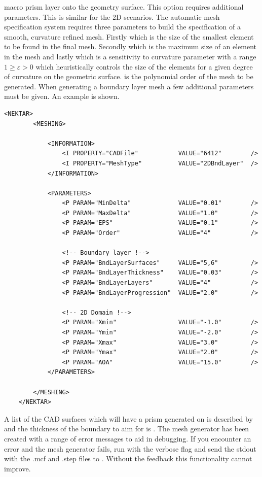 macro prism layer onto the geometry surface. This option requires additional
parameters. This is similar for the 2D scenarios. The automatic mesh
specification system requires three parameters to build the specification of a
smooth, curvature refined mesh. Firstly  which is the size of
the smallest element to be found in the final mesh. Secondly 
which is the maximum size of an element in the mesh and lastly  which
is a sensitivity to curvature parameter with a range $1 \geq \varepsilon > 0$
which heuristically controls the size of the elements for a given degree of
curvature on the geometric surface.  is the polynomial order of the
mesh to be generated.
%
When generating a boundary layer mesh a few additional parameters must be given.
An example is shown.
\begin{lstlisting}[style=XmlStyle]
    <NEKTAR>
        <MESHING>

            <INFORMATION>
                <I PROPERTY="CADFile"           VALUE="6412"        />
                <I PROPERTY="MeshType"          VALUE="2DBndLayer"  />
            </INFORMATION>

            <PARAMETERS>
                <P PARAM="MinDelta"             VALUE="0.01"        />
                <P PARAM="MaxDelta"             VALUE="1.0"         />
                <P PARAM="EPS"                  VALUE="0.1"         />
                <P PARAM="Order"                VALUE="4"           />

                <!-- Boundary layer !-->
                <P PARAM="BndLayerSurfaces"     VALUE="5,6"         />
                <P PARAM="BndLayerThickness"    VALUE="0.03"        />
                <P PARAM="BndLayerLayers"       VALUE="4"           />
                <P PARAM="BndLayerProgression"  VALUE="2.0"         />

                <!-- 2D Domain !-->
                <P PARAM="Xmin"                 VALUE="-1.0"        />
                <P PARAM="Ymin"                 VALUE="-2.0"        />
                <P PARAM="Xmax"                 VALUE="3.0"         />
                <P PARAM="Ymax"                 VALUE="2.0"         />
                <P PARAM="AOA"                  VALUE="15.0"        />
            </PARAMETERS>

        </MESHING>
    </NEKTAR>
\end{lstlisting}
A list of the CAD surfaces which will have a prism generated on is described by
 and the thickness of the boundary to aim for is .
%
The mesh generator has been created with a range of error messages to aid in
debugging. If you encounter an error and the mesh generator fails, run \nm with
the verbose  flag and send the stdout with the .mcf and .step files to
. Without the feedback this functionality cannot
improve.

